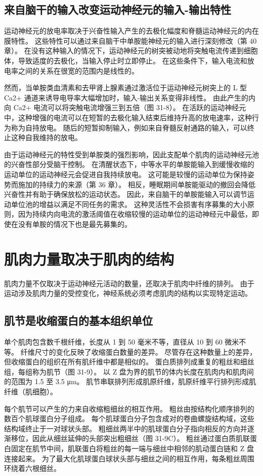 \subsection{来自脑干的输入改变运动神经元的输入-输出特性}
运动神经元的放电率取决于兴奋性输入产生的去极化幅度和脊髓运动神经元的内在膜特性。 这些特性可以通过来自脑干中单胺能神经元的输入进行深刻修改（第 40 章）。 在没有这种输入的情况下，运动神经元的树突被动地将突触电流传递到细胞体，导致适度的去极化，当输入停止时立即停止。 在这些条件下，输入电流和放电率之间的关系在很宽的范围内是线性的。

然而，当单胺类血清素和去甲肾上腺素通过激活位于运动神经元树突上的 L 型 Ca2+ 通道来诱导电导率大幅增加时，输入-输出关系变得非线性。 由此产生的内向 Ca2+ 电流可以将突触电流增强三到五倍（图 31-8）。 在活跃的运动神经元中，这种增强的电流可以在短暂的去极化输入结束后维持升高的放电速率，这种行为称为自持放电。 随后的短暂抑制输入，例如来自脊髓反射通路的输入，可以终止这种自我维持的放电。

由于运动神经元的特性受到单胺类的强烈影响，因此支配单个肌肉的运动神经元池的兴奋性部分受脑干控制。 在清醒状态下，中等水平的单胺能输入到缓慢收缩的运动单位的运动神经元会促进自我持续放电。 这可能是较慢的运动单位为保持姿势而施加的持续力的来源（第 36 章）。 相反，睡眠期间单胺能驱动的撤回会降低兴奋性并有助于确保放松的运动状态。 因此，来自脑干的单胺能输入可以调节运动单位池的增益以满足不同任务的需求。 这种灵活性不会损害有序募集的大小原则，因为持续内向电流的激活阈值在收缩较慢的运动单位的运动神经元中最低，即使在没有单胺的情况下也是最先募集的。


\section{肌肉力量取决于肌肉的结构}
肌肉力量不仅取决于运动神经元活动的数量，还取决于肌肉中纤维的排列。 由于运动涉及肌肉力量的受控变化，神经系统必须考虑肌肉的结构以实现特定运动。

\subsection{肌节是收缩蛋白的基本组织单位}
单个肌肉包含数千根纤维，长度从 1 到 50 毫米不等，直径从 10 到 60 微米不等。 纤维尺寸的变化反映了收缩蛋白数量的差异。 尽管存在这种数量上的差异，但收缩蛋白的组织在所有肌纤维中都是相似的。 蛋白质排列成重复的粗丝和细丝组，每组称为肌节（图 31-9）。 以 Z 盘为界的肌节的体内长度在肌肉内和肌肉间的范围为 1.5 至 3.5 μm。 肌节串联排列形成肌原纤维，肌原纤维平行排列形成肌纤维（肌细胞）。

每个肌节可以产生的力来自收缩粗细丝的相互作用。 粗丝由按结构化顺序排列的数百个肌球蛋白分子组成。 每个肌球蛋白分子包含成对的卷曲螺旋结构域，这些结构域终止于一对球状头部。 粗细丝两半中的肌球蛋白分子指向相反的方向并逐渐移位，因此从细丝延伸的头部突出粗细丝（图 31-9C）。 粗丝通过蛋白质肌联蛋白固定在肌节中间，肌联蛋白将粗丝的每一端与细丝中相邻的肌动蛋白链和 Z 盘连接起来。 为了最大化肌球蛋白球状头部与细丝之间的相互作用，每条粗丝周围环绕着六根细丝。

